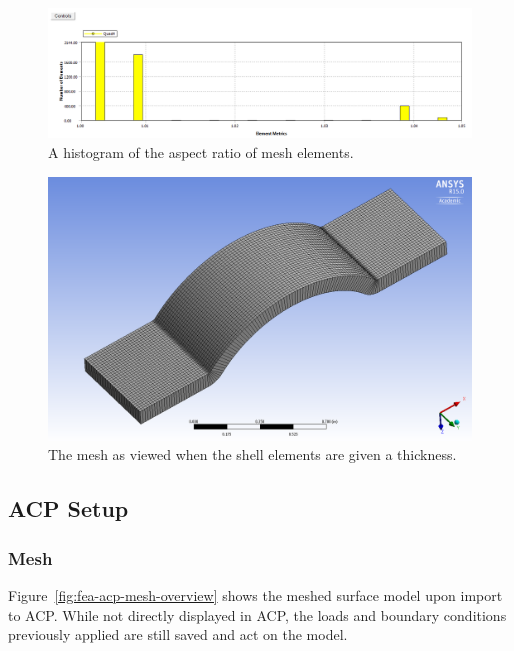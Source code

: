 \begin{figure}[htp]
\centering
\includegraphics[width=1\textwidth]{./figures/fea/fea-mechanical-mesh-metrics-histogram}
\caption{A histogram of the aspect ratio of mesh elements.}
\label{fig:fea-mechanical-mesh-metrics-histogram}
\end{figure}

\begin{figure}[htp]
\centering
\includegraphics[width=1\textwidth]{./figures/fea/fea-mechanical-mesh-thick-shell}
\caption{The mesh as viewed when the shell elements are given a thickness.}
\label{fig:fea-mechanical-mesh-thick-shell}
\end{figure}


\clearpage

\subsection{ACP Setup}

\subsubsection{Mesh}

\indent

Figure~\ref{fig:fea-acp-mesh-overview} shows the meshed surface model upon import to ACP. While not directly displayed in ACP, the loads and boundary conditions previously applied are still saved and act on the model.\\

